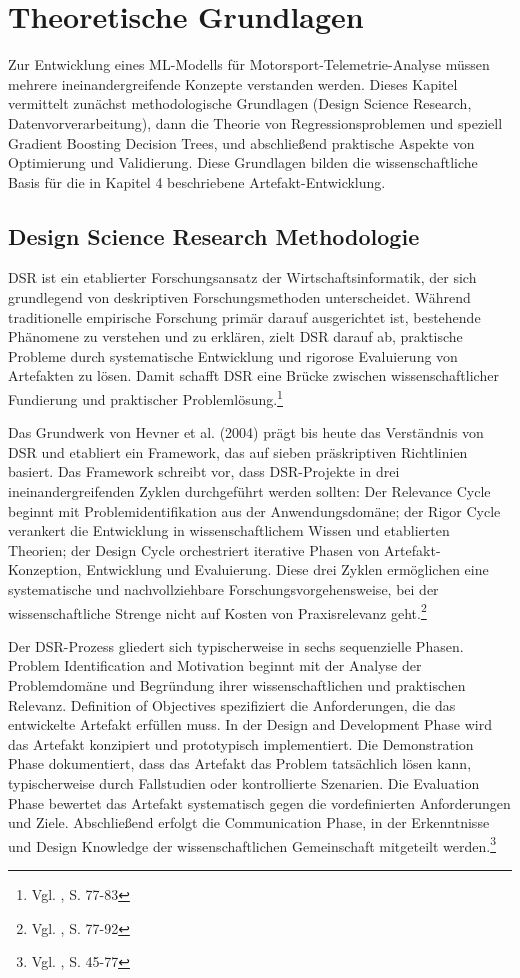 \chapter{Theoretische Grundlagen}

Zur Entwicklung eines \ac{ML}-Modells für Motorsport-Telemetrie-Analyse 
müssen mehrere ineinandergreifende Konzepte verstanden werden. Dieses Kapitel 
vermittelt zunächst methodologische Grundlagen (Design Science Research, 
Datenvorverarbeitung), dann die Theorie von Regressionsproblemen und speziell 
Gradient Boosting Decision Trees, und abschließend praktische Aspekte von 
Optimierung und Validierung. Diese Grundlagen bilden die wissenschaftliche Basis 
für die in Kapitel 4 beschriebene Artefakt-Entwicklung.


\section{Design Science Research Methodologie}

\ac{DSR} ist ein etablierter Forschungsansatz der Wirtschaftsinformatik, der sich grundlegend von deskriptiven Forschungsmethoden unterscheidet. Während traditionelle empirische Forschung primär darauf ausgerichtet ist, bestehende Phänomene zu verstehen und zu erklären, zielt \ac{DSR} darauf ab, praktische Probleme durch systematische Entwicklung und rigorose Evaluierung von Artefakten zu lösen. Damit schafft \ac{DSR} eine Brücke zwischen wissenschaftlicher Fundierung und praktischer Problemlösung.\footnote{Vgl. \cite{Hevner2004}, S. 77-83}

Das Grundwerk von Hevner et al. (2004) prägt bis heute das Verständnis von \ac{DSR} und etabliert ein Framework, das auf sieben präskriptiven Richtlinien basiert. Das Framework schreibt vor, dass \ac{DSR}-Projekte in drei ineinandergreifenden Zyklen durchgeführt werden sollten: Der Relevance Cycle beginnt mit Problemidentifikation aus der Anwendungsdomäne; der Rigor Cycle verankert die Entwicklung in wissenschaftlichem Wissen und etablierten Theorien; der Design Cycle orchestriert iterative Phasen von Artefakt-Konzeption, Entwicklung und Evaluierung. Diese drei Zyklen ermöglichen eine systematische und nachvollziehbare Forschungsvorgehensweise, bei der wissenschaftliche Strenge nicht auf Kosten von Praxisrelevanz geht.\footnote{Vgl. \cite{Hevner2004}, S. 77-92}

Der \ac{DSR}-Prozess gliedert sich typischerweise in sechs sequenzielle Phasen. Problem Identification and Motivation beginnt mit der Analyse der Problemdomäne und Begründung ihrer wissenschaftlichen und praktischen Relevanz. Definition of Objectives spezifiziert die Anforderungen, die das entwickelte Artefakt erfüllen muss. In der Design and Development Phase wird das Artefakt konzipiert und prototypisch implementiert. Die Demonstration Phase dokumentiert, dass das Artefakt das Problem tatsächlich lösen kann, typischerweise durch Fallstudien oder kontrollierte Szenarien. Die Evaluation Phase bewertet das Artefakt systematisch gegen die vordefinierten Anforderungen und Ziele. Abschließend erfolgt die Communication Phase, in der Erkenntnisse und Design Knowledge der wissenschaftlichen Gemeinschaft mitgeteilt werden.\footnote{Vgl. \cite{Peffers2007}, S. 45-77} 

